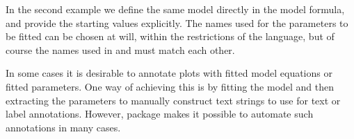 \documentclass[krantz2]{krantz}\usepackage{knitr}
\begin{document}
\begin{knitrout}\footnotesize
{}\color{fgcolor}\begin{kframe}
\begin{alltt}
    \hlopt{+}
  \hlstd{()} \hlopt{+}
  \hlstd{(} \hlstd{=} \hlstd{,}
                \hlopt{~} 
               \hlstd{=} \hlstd{)}
\end{alltt}
\end{kframe}
\end{knitrout}

In the second example we define the same model directly in the model formula, and provide the starting values explicitly. The names used for the parameters to be fitted can be chosen at will, within the restrictions of the \Rlang language, but of course the names used in  and  must match each other.

\begin{knitrout}\footnotesize
{}\color{fgcolor}\begin{kframe}
\begin{alltt}
    \hlopt{+}
  \hlstd{()} \hlopt{+}
  \hlstd{(} \hlstd{=} \hlstd{,}
               \hlstd{=} \hlstd{(}  \hlopt{~}  \hlopt{*}  \hlopt{/}  \hlopt{+} 
                                  \hlstd{=} \hlstd{(} \hlstd{=} \hlstd{,}  \hlstd{=} \hlstd{)),}
               \hlstd{=} \hlstd{)}
\end{alltt}
\end{kframe}
\end{knitrout}

In some cases it is desirable to annotate plots with fitted model equations or fitted parameters. One way of achieving this is by fitting the model and then extracting the parameters to manually construct text strings to use for text or label annotations. However, package  makes it possible to automate such annotations in many cases.
\end{document}
